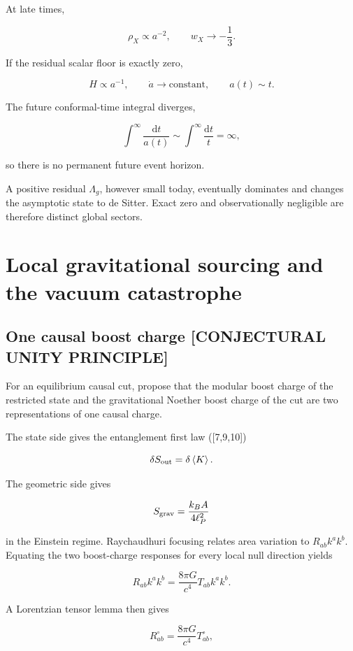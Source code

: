 \documentclass[
  11pt,
  letterpaper,
]{article}
\begin{document}
At late times,

\[
\rho_X\propto a^{-2},
\qquad
w_X\to-\frac13.
\]

If the residual scalar floor is exactly zero,

\[
H\propto a^{-1},
\qquad
\dot a\to\text{constant},
\qquad
a(t)\sim t.
\]

The future conformal-time integral diverges,

\[
\int^\infty\frac{\mathrm dt}{a(t)}\sim\int^\infty\frac{\mathrm dt}{t}=\infty,
\]

so there is no permanent future event horizon.

A positive residual \(\Lambda_g\), however small today, eventually
dominates and changes the asymptotic state to de Sitter. Exact zero and
observationally negligible are therefore distinct global sectors.

\section{Local gravitational sourcing and the vacuum
catastrophe}\label{local-gravitational-sourcing-and-the-vacuum-catastrophe}

\subsection{One causal boost charge {[}CONJECTURAL UNITY
PRINCIPLE{]}}\label{one-causal-boost-charge-conjectural-unity-principle}

For an equilibrium causal cut, propose that the modular boost charge of
the restricted state and the gravitational Noether boost charge of the
cut are two representations of one causal charge.

The state side gives the entanglement first law ({[}7,9,10{]})

\[
\delta S_{\rm out}=\delta\left\langle K\right\rangle.
\]

The geometric side gives

\[
S_{\rm grav}=\frac{k_BA}{4\ell_P^2}
\]

in the Einstein regime. Raychaudhuri focusing relates area variation to
\(R_{ab}k^ak^b\). Equating the two boost-charge responses for every
local null direction yields

\[
R_{ab}k^ak^b=\frac{8\pi G}{c^4}T_{ab}k^ak^b.
\]

A Lorentzian tensor lemma then gives

\[
R_{ab}^{\circ}=\frac{8\pi G}{c^4}T_{ab}^{\circ},
\]
\end{document}
